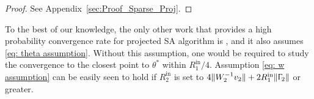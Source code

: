 \documentclass[usenames,dvipsnames,final,12pt]{colt2018} %
\newcommand{\Rti}{R_1^{\textrm{in}}}
\newcommand{\thS}{\theta^*}
\newcommand{\vw}{v_2}
\newcommand{\Tw}{\Upgamma_2}
\newcommand{\Ww}{W_2}
\newcommand{\Rzi}{R_2^{\textrm{in}}}
\newcommand{\gugan}[1]{#1}
\begin{document}
\gugan{
\begin{proof}
See Appendix~\ref{sec:Proof_Sparse_Proj}.
\end{proof}
}

\begin{remark}
	To the best of our knowledge, the only other work that provides
	a high probability convergence rate for
	projected SA algorithm is \citep{liu2015finite}, and it also assumes \eqref{eq: theta assumption}. Without this assumption, one would be required \gugan{to} study the convergence to the closest point to $\thS$ within $\Rti/4.$
	Assumption \eqref{eq: w assumption} can be easily seen to hold if $\Rzi$ is set to $4\|\Ww^{-1}\vw\|+2\Rti\|\Tw\|$ or greater.
\end{remark}
\end{document}

